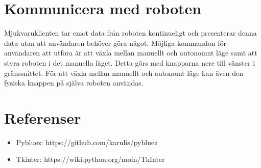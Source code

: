 \documentclass{article}
\begin{document}
\section{Kommunicera med roboten}
Mjukvaruklienten tar emot data från roboten kontinueligt och presenterar denna data utan att användaren behöver göra något.
Möjliga kommandon för användaren att utföra är att växla mellan manuellt och autonomnt läge samt att styra roboten i det manuella läget. Detta görs med knapparna nere till vänster i gränssnittet.
För att växla mellan manuellt och autonomt läge kan även den fysiska knappen på själva roboten användas. 


\clearpage
\section{Referenser}
\begin{itemize}
	\item Pybluez: https://github.com/karulis/pybluez
	\item Tkinter: https://wiki.python.org/moin/TkInter
\end{itemize}

\nocite{*}
{}

\end{document}
